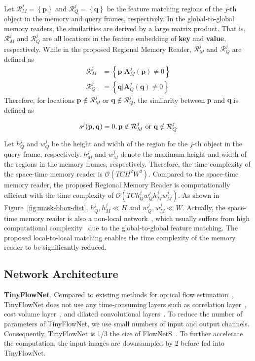 \documentclass[final]{cvpr}
\begin{document}
Let $\mathcal{R}_M^j = \left\{\mathbf{p}\right\}$ and $\mathcal{R}_Q^j = \left\{\mathbf{q}\right\}$ be the feature matching regions of the $j$-th object in the memory and query frames, respectively.
In the global-to-global memory readers, the similarities are derived by a large matrix product.
That is, $\mathcal{R}_M^j$ and $\mathcal{R}_Q^j$ are all locations in the feature embedding of \textbf{key} and \textbf{value}, respectively.
While in the proposed Regional Memory Reader, $\mathcal{R}_M^j$ and $\mathcal{R}_Q^j$ are defined as
\begin{align}
  \mathcal{R}_M^j &= \left\{\mathbf{p} | \mathbf{A}_M^j(\mathbf{p}) \neq 0 \right\} \nonumber
  \\
  \mathcal{R}_Q^j &= \left\{\mathbf{q} | \mathbf{A}_Q^j(\mathbf{q}) \neq 0 \right\}
\end{align}
Therefore, for locations $\mathbf{p} \notin \mathcal{R}_M^j$ or $\mathbf{q} \notin \mathcal{R}_Q^j$, the similarity between $\mathbf{p}$ and $\mathbf{q}$ is defined as

\begin{equation}
  s^j(\mathbf{p}, \mathbf{q}) = 0, 
  \mathbf{p} \notin \mathcal{R}_M^j~{\rm or}~\mathbf{q} \notin \mathcal{R}_Q^j
\end{equation}

Let $h_Q^j$ and $w_Q^j$ be the height and width of the region for the $j$-th object in the query frame, respectively.
$h_M^j$ and $w_M^j$ denote the maximum height and width of the regions in the memory frames, respectively.
Therefore, the time complexity of the space-time memory reader is $\mathcal{O}(T C H^2 W^2)$.
Compared to the space-time memory reader, the proposed Regional Memory Reader is computationally efficient with the time complexity of $\mathcal{O}(T C h_Q^j w_Q^j h_M^j w_M^j)$.
As shown in Figure~\ref{fig:mask-bbox-dist}, $h_Q^j, h_M^j \ll H$ and $w_Q^j, w_M^j \ll W$.
Actually, the space-time memory reader is also a non-local network~\cite{DBLP:conf/cvpr/0004GGH18}, which usually suffers from high computational complexity~\cite{DBLP:conf/iccv/ZhuXBHB19} due to the global-to-global feature matching.
The proposed local-to-local matching enables the time complexity of the memory reader to be significantly reduced.

\subsection{Network Architecture}

\noindent \textbf{TinyFlowNet}.
Compared to existing methods for optical flow estimation~\cite{DBLP:conf/iccv/DosovitskiyFIHH15,DBLP:conf/cvpr/SchusterWUS19,DBLP:conf/cvpr/SunY0K18,DBLP:conf/cvpr/XuRK17}, TinyFlowNet does not use any time-consuming layers such as correlation layer~\cite{DBLP:conf/iccv/DosovitskiyFIHH15}, cost volume layer~\cite{DBLP:conf/cvpr/SunY0K18,DBLP:conf/cvpr/XuRK17}, and dilated convolutional layers~\cite{DBLP:conf/cvpr/SchusterWUS19}.
To reduce the number of parameters of TinyFlowNet, we use small numbers of input and output channels.
Consequently, TinyFlowNet is 1/3 the size of FlowNetS~\cite{DBLP:conf/cvpr/IlgMSKDB17}.
To further accelerate the computation, the input images are downsampled by 2 before fed into TinyFlowNet.
\end{document}
